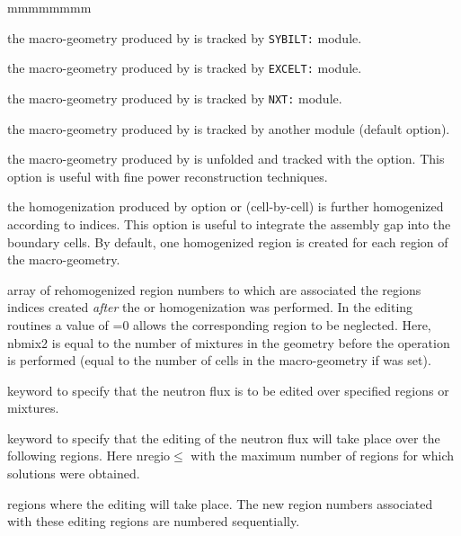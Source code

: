 \begin{ListeDeDescription}{mmmmmmmm}
\item[\moc{SYBIL}] the macro-geometry produced by  is tracked by {\tt SYBILT:} module.

\item[\moc{EXCELL}] the macro-geometry produced by  is tracked by {\tt EXCELT:} module.

\item[\moc{NXT}] the macro-geometry produced by  is tracked by {\tt NXT:} module.

\item[\moc{DEFAULT}] the macro-geometry produced by  is tracked by another module (default option).

\item[\moc{UNFOLD}] the macro-geometry produced by  is unfolded and tracked with the  option. This option is
useful with fine power reconstruction techniques.

\item[\moc{REMIX}] the homogenization produced by option   or   (cell-by-cell) is further
homogenized according to  indices. This option is useful to integrate the assembly gap into the boundary cells. By default, one homogenized region is created
for each region of the macro-geometry.

\item[\dusa{imix2}] array of rehomogenized region numbers to which are associated the regions indices created {\sl after}
the   or   homogenization was performed. In the editing routines a value of =0 allows the corresponding
region to be neglected. Here, nbmix2 is equal to the number of mixtures in the geometry before the  operation is performed (equal to the number
of cells in the macro-geometry if   was set).

\item[\moc{TAKE}] keyword to specify that the neutron flux is to be edited
over specified regions or mixtures. 

\item[\moc{REGI}] keyword to specify that the editing of the neutron flux will
take place over the following regions. Here nregio$\le$
with  the maximum number of regions for which solutions were
obtained.

\item[\dusa{iregt}] regions where the editing will take place. The new region
numbers associated with these editing regions are numbered sequentially.


\end{ListeDeDescription}

